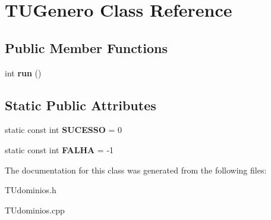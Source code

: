 \hypertarget{classTUGenero}{}\section{T\+U\+Genero Class Reference}
\label{classTUGenero}
\subsection*{Public Member Functions}
\begin{DoxyCompactItemize}
\item 
\mbox{\label{classTUGenero_ade5f70b689c22924dfbd50bfabf0666c}} 
int {\bfseries run} ()
\end{DoxyCompactItemize}
\subsection*{Static Public Attributes}
\begin{DoxyCompactItemize}
\item 
\mbox{\label{classTUGenero_ab15bab45434471dc39d2f7059f6a0dbe}} 
static const int {\bfseries S\+U\+C\+E\+S\+SO} = 0
\item 
\mbox{\label{classTUGenero_abb6dc9bf4224ec579dcc876da2b10daa}} 
static const int {\bfseries F\+A\+L\+HA} = -\/1
\end{DoxyCompactItemize}


The documentation for this class was generated from the following files\+:\begin{DoxyCompactItemize}
\item 
T\+Udominios.\+h\item 
T\+Udominios.\+cpp\end{DoxyCompactItemize}
